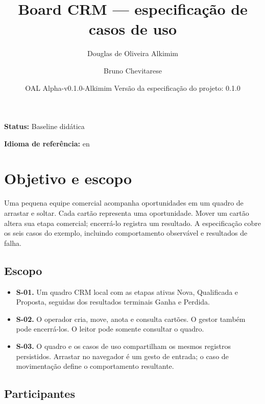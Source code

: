 \documentclass[10pt,a4paper]{article}
\begin{document}
\title{Board CRM --- especificação de casos de uso}

\author{Douglas de Oliveira Alkimim \and Bruno Chevitarese}

\date{OAL Alpha-v0.1.0-Alkimim \quad Versão da especificação do projeto: 0.1.0}

\maketitle

\textbf{Status:} Baseline didática

\textbf{Idioma de referência:} en

\section{Objetivo e escopo}

Uma pequena equipe comercial acompanha oportunidades em um quadro de arrastar e soltar. Cada cartão representa uma oportunidade. Mover um cartão altera sua etapa comercial; encerrá-lo registra um resultado. A especificação cobre os seis casos do exemplo, incluindo comportamento observável e resultados de falha.

\subsection{Escopo}

\begin{itemize}

\item \textbf{S-01.} Um quadro CRM local com as etapas ativas Nova, Qualificada e Proposta, seguidas dos resultados terminais Ganha e Perdida.

\item \textbf{S-02.} O operador cria, move, anota e consulta cartões. O gestor também pode encerrá-los. O leitor pode somente consultar o quadro.

\item \textbf{S-03.} O quadro e os casos de uso compartilham os mesmos registros persistidos. Arrastar no navegador é um gesto de entrada; o caso de movimentação define o comportamento resultante.

\end{itemize}

\subsection{Participantes}
\end{document}
